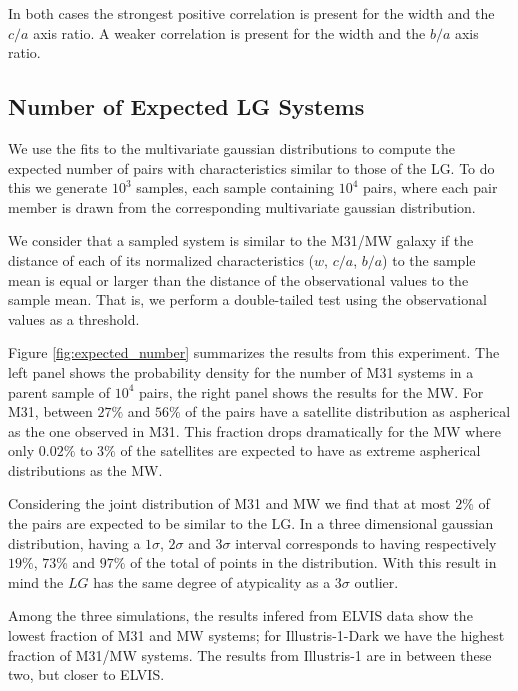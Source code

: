 \documentclass[a4paper,fleqn,usenatbib]{mnras}
\begin{document}
In both cases the strongest positive correlation is present for the
width and the $c/a$ axis ratio. A weaker correlation is present for
the width and the $b/a$ axis ratio. 



\subsection{Number of Expected LG Systems}

We use the fits to the multivariate gaussian distributions to
compute the expected number of pairs with characteristics similar to
those of the LG.
To do this we generate $10^3$ samples, each sample containing $10^4$
pairs, where each pair member is drawn from the corresponding
multivariate gaussian distribution.  

We consider that a sampled system is similar to the M31/MW galaxy if the
distance of each of its normalized characteristics ($w$, $c/a$, $b/a$) to the
sample mean is equal or larger than the distance of the observational
values to the sample mean.   
That is, we perform a double-tailed test using the observational
values as a threshold. 

Figure \ref{fig:expected_number} summarizes the results from this
experiment. The left panel shows the probability density for the number of M31
systems in a parent sample of $10^4$ pairs, the right panel shows the
results for the MW.
For M31, between $27\%$ and $56\%$ of the pairs have a satellite
distribution as aspherical as the one observed in M31. This fraction drops
dramatically for the MW where only $0.02\%$ to $3\%$ of the satellites
are expected to have as extreme aspherical distributions as the MW.

Considering the joint distribution of M31 and MW we find that at most
$2\%$ of the pairs are expected to be similar to the LG.
In a three dimensional gaussian distribution, having a $1\sigma$,
$2\sigma$ and $3\sigma$ interval corresponds to having respectively $19 \%$, $73 \%$ and
$97 \%$ of the total of points in the distribution.
With this result in mind the $LG$ has the same degree of atypicality
as a $3\sigma$ outlier. 

Among the three simulations, the results infered from ELVIS data show
the lowest fraction of M31 and MW systems; for Illustris-1-Dark we have
the highest fraction of M31/MW systems. The results from Illustris-1
are in between these two, but closer to ELVIS.
\end{document}
